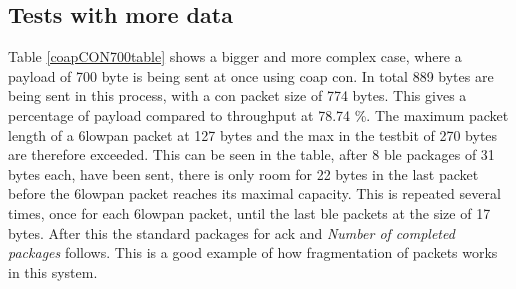 \subsection{Tests with more data}

\noindent Table \ref{coapCON700table} shows a bigger and more complex case, where a payload of 700 byte is being sent at once using \gls{coap} \gls{con}. In total 889 bytes are being sent in this process, with a \gls{con} packet size of 774 bytes. This gives a percentage of \gls{payload} compared to \gls{throughput} at 78.74 \%. The maximum packet length of a \gls{6lowpan} packet at 127 bytes and the max in the testbit of 270 bytes are therefore exceeded. This can be seen in the table, after 8 \gls{ble} packages of 31 bytes each, have been sent, there is only room for 22 bytes in the last packet before the \gls{6lowpan} packet reaches its maximal capacity. This is repeated several times, once for each \gls{6lowpan} packet, until the last \gls{ble} packets at the size of 17 bytes. After this the standard packages for \gls{ack} and \textit{Number of completed packages} follows. This is a good example of how fragmentation of packets works in this system. 


